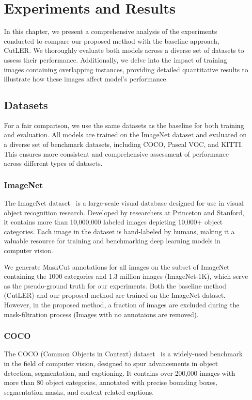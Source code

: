 \chapter{Experiments and Results}\label{chap:experiments}
In this chapter, we present a comprehensive analysis of the experiments conducted to compare our proposed method with the baseline approach, CutLER. We thoroughly evaluate both models across a diverse set of datasets to assess their performance. Additionally, we delve into the impact of training images containing overlapping instances, providing detailed quantitative results to illustrate how these images affect model's performance. 

\section{Datasets}
For a fair comparison, we use the same datasets as the baseline for both training and evaluation. All models are trained on the ImageNet dataset and evaluated on a diverse set of benchmark datasets, including COCO, Pascal VOC, and KITTI. This ensures more consistent and comprehensive assessment of performance across different types of datasets.

\subsection{ImageNet}
The ImageNet dataset~\cite{deng2009imagenet} is a large-scale visual database designed for use in visual object recognition research. Developed by researchers at Princeton and Stanford, it contains more than 10,000,000 labeled images depicting 10,000+ object categories. Each image in the dataset is hand-labeled by humans, making it a valuable resource for training and benchmarking deep learning models in computer vision.

We generate MaskCut annotations for all images on the subset of ImageNet containing the 1000 categories and 1.3 million images (ImageNet-1K), which serve as the pseudo-ground truth for our experiments. Both the baseline method (CutLER) and our proposed method are trained on the ImageNet dataset. However, in the proposed method, a fraction of images are excluded during the mask-filtration process (Images with no annotaions are removed).

\subsection{COCO}
The COCO (Common Objects in Context) dataset~\cite{lin2015microsoftcococommonobjects} is a widely-used benchmark in the field of computer vision, designed to spur advancements in object detection, segmentation, and captioning. It contains over 200,000 images with more than 80 object categories, annotated with precise bounding boxes, segmentation masks, and context-related captions. 

